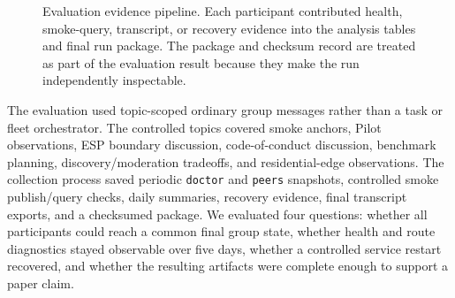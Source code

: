 \documentclass[11pt,a4paper,twocolumn]{article}
\begin{document}
\begin{figure}[t]
\centering
{}
\caption{Evaluation evidence pipeline. Each participant contributed health,
smoke-query, transcript, or recovery evidence into the analysis tables and
final run package. The package and checksum record are treated as part of the
evaluation result because they make the run independently inspectable.}
\label{fig:evaluationpipeline}
\end{figure}

The evaluation used topic-scoped ordinary group messages rather than a task
or fleet orchestrator. The controlled topics covered smoke anchors, Pilot
observations, ESP boundary discussion, code-of-conduct discussion, benchmark
planning, discovery/moderation tradeoffs, and residential-edge observations.
The collection process saved periodic \texttt{doctor} and \texttt{peers}
snapshots, controlled smoke publish/query checks, daily summaries, recovery
evidence, final transcript exports, and a checksumed package. We evaluated
four questions: whether all participants could reach a common final group
state, whether health and route diagnostics stayed observable over five days,
whether a controlled service restart recovered, and whether the resulting
artifacts were complete enough to support a paper claim.
\end{document}
